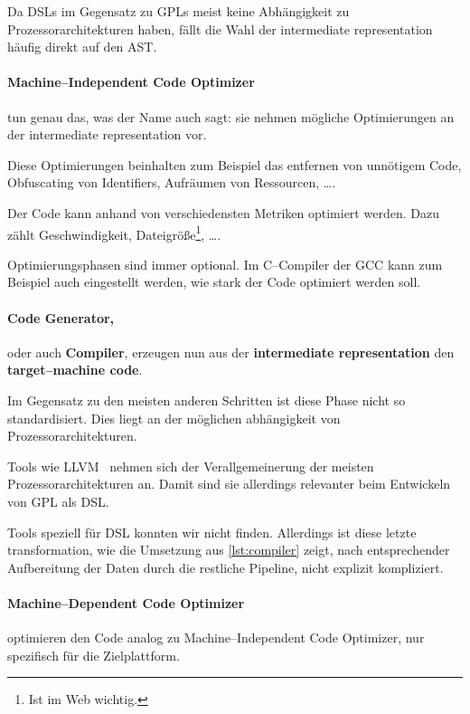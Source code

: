 Da \acp{DSL} im Gegensatz zu \acp{GPL} meist keine Abhängigkeit zu Prozessorarchitekturen haben, fällt die Wahl der intermediate representation häufig direkt auf den \ac{AST}.

\paragraph{Machine--Independent Code Optimizer} tun genau das, was der Name auch sagt: sie nehmen mögliche Optimierungen an der intermediate representation vor.

Diese Optimierungen beinhalten zum Beispiel das entfernen von unnötigem Code, Obfuscating von Identifiers, Aufräumen von Ressourcen, \dots.

Der Code kann anhand von verschiedensten Metriken optimiert werden.
Dazu zählt Geschwindigkeit, Dateigröße\footnote{Ist im Web wichtig.}, \dots.

Optimierungsphasen sind immer optional.
Im C--Compiler der \ac{GCC} kann zum Beispiel auch eingestellt werden, wie stark der Code optimiert werden soll.~\autocite{gnu-project-no-date}

\paragraph{Code Generator,} oder auch \textbf{Compiler}, erzeugen nun aus der \textbf{intermediate representation} den \textbf{target--machine code}.

Im Gegensatz zu den meisten anderen Schritten ist diese Phase nicht so standardisiert.
Dies liegt an der möglichen abhängigkeit von Prozessorarchitekturen.

Tools wie \ac{LLVM}~\autocite{llvm-project-2024} nehmen sich der Verallgemeinerung der meisten Prozessorarchitekturen an.
Damit sind sie allerdings relevanter beim Entwickeln von \ac{GPL} als \ac{DSL}.

Tools speziell für \ac{DSL} konnten wir nicht finden.
Allerdings ist diese letzte transformation, wie die Umsetzung aus \autoref{lst:compiler} zeigt, nach entsprechender Aufbereitung der Daten durch die restliche Pipeline, nicht explizit kompliziert.

\paragraph{Machine--Dependent Code Optimizer} optimieren den Code analog zu Machine--Independent Code Optimizer, nur spezifisch für die Zielplattform.

